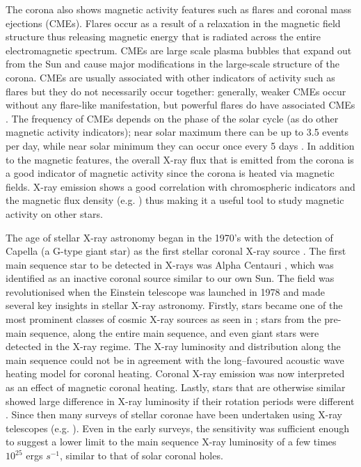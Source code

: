 The corona also shows magnetic activity features such as flares and coronal mass ejections (CMEs). Flares occur as a result of a relaxation in the magnetic field structure thus releasing magnetic energy that is radiated across the entire electromagnetic spectrum. CMEs are large scale plasma bubbles that expand out from the Sun and cause major modifications in the large-scale structure of the corona. CMEs are usually associated with other indicators of activity such as flares but they do not necessarily occur together: generally, weaker CMEs occur without any flare-like manifestation, but powerful flares do have associated CMEs \citep{Andrews_2003}. The frequency of CMEs depends on the phase of the solar cycle (as do other magnetic activity indicators); near solar maximum there can be up to 3.5 events per day, while near solar minimum they can occur once every 5 days \citep{Carroll_Ostlie_2006}. In addition to the magnetic features, the overall X-ray flux that is emitted from the corona is a good indicator of magnetic activity since the corona is heated via magnetic fields. X-ray emission shows a good correlation with chromospheric indicators and the magnetic flux density (e.g. \citealt{Schrijver_etal_1992,Pevtsov_etal_2003}) thus making it a useful tool to study magnetic activity on other stars.

The age of stellar X-ray astronomy began in the 1970's with the detection of Capella (a G-type giant star) as the first stellar coronal X-ray source \citep{Catura_etal_1975}. The first main sequence star to be detected in X-rays was Alpha Centauri \citep{Nugent_Garmire_1978}, which was identified as an inactive coronal source similar to our own Sun. The field was revolutionised when the Einstein telescope was launched in 1978 and made several key insights in stellar X-ray astronomy. Firstly, stars became one of the most prominent classes of cosmic X-ray sources as seen in \citet{Vaiana_etal_1981}; stars from the pre-main sequence, along the entire main sequence, and even giant stars were detected in the X-ray regime. The X-ray luminosity and distribution along the main sequence could not be in agreement with the long--favoured acoustic wave heating model for coronal heating. Coronal X-ray emission was now interpreted as an effect of magnetic coronal heating. Lastly, stars that are otherwise similar showed large difference in X-ray luminosity if their rotation periods were different \citep{Pallavicini_etal_1981}. Since then many surveys of stellar coronae have been undertaken using X-ray telescopes (e.g. \citealt{Fleming_etal_1995,Schmitt_1997,Nebot_etal_2013,Wood_etal_2018}). Even in the early surveys, the sensitivity was sufficient enough to suggest a lower limit to the main sequence X-ray luminosity of a few times $10^{25}$ ergs $s^{-1}$, similar to that of solar coronal holes.

